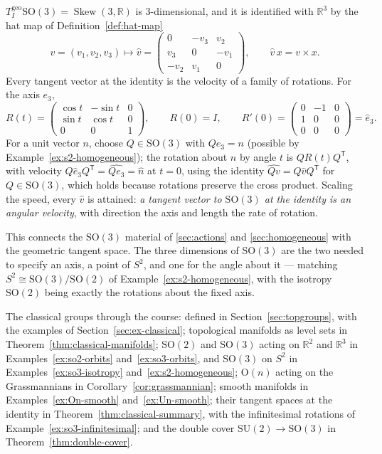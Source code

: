 \documentclass[11pt]{report}
\makeatletter
\newcounter{excounter}[section]
\newcommand{\exlabel}[1]{\edef\@currentlabel{\arabic{section}.\arabic{excounter}}\label{#1}}
\newcommand{\Ogp}{\mathrm{O}}
\newcommand{\SO}{\mathrm{SO}}
\DeclareMathOperator{\Skew}{Skew}
\newcommand{\geo}{\mathrm{geo}}
\makeatother
\begin{document}
\begin{exbox}[$\SO(3)$ and Infinitesimal Rotations]\exlabel{ex:so3-infinitesimal}
$T^{\geo}_I\SO(3) = \Skew(3,\mathbb{R})$ is $3$-dimensional, and it is identified with $\mathbb{R}^3$ by the hat map of Definition~\ref{def:hat-map}
\[
v = (v_1,v_2,v_3) \longmapsto \hat v = \begin{pmatrix} 0 & -v_3 & v_2 \\ v_3 & 0 & -v_1 \\ -v_2 & v_1 & 0 \end{pmatrix},
\qquad \hat v\, x = v \times x .
\]
Every tangent vector at the identity is the velocity of a family of rotations. For the axis $e_3$,
\[
R(t) = \begin{pmatrix} \cos t & -\sin t & 0 \\ \sin t & \cos t & 0 \\ 0 & 0 & 1 \end{pmatrix}, \qquad R(0) = I, \qquad R'(0) = \begin{pmatrix} 0 & -1 & 0 \\ 1 & 0 & 0 \\ 0 & 0 & 0 \end{pmatrix} = \hat e_3 .
\]
For a unit vector $n$, choose $Q \in \SO(3)$ with $Qe_3 = n$ (possible by Example~\ref{ex:s2-homogeneous}); the rotation about $n$ by angle $t$ is $QR(t)Q^{\mathsf T}$, with velocity $Q\hat e_3 Q^{\mathsf T} = \widehat{Qe_3} = \hat n$ at $t = 0$, using the identity $\widehat{Qv} = Q\hat vQ^{\mathsf T}$ for $Q \in \SO(3)$, which holds because rotations preserve the cross product. Scaling the speed, every $\hat v$ is attained: \emph{a tangent vector to $\SO(3)$ at the identity is an angular velocity}, with direction the axis and length the rate of rotation.
\end{exbox}

\begin{rembox}\label{rem:tangent-6}
This connects the $\SO(3)$ material of \ref{sec:actions} and \ref{sec:homogeneous} with the geometric tangent space. The three dimensions of $\SO(3)$ are the two needed to specify an axis, a point of $S^2$, and one for the angle about it --- matching $S^2 \cong \SO(3)/\SO(2)$ of Example~\ref{ex:s2-homogeneous}, with the isotropy $\SO(2)$ being exactly the rotations about the fixed axis.
\end{rembox}

The classical groups through the course: defined in Section~\ref{sec:topgroups}, with the examples of Section~\ref{sec:ex-classical}; topological manifolds as level sets in Theorem~\ref{thm:classical-manifolds}; $\SO(2)$ and $\SO(3)$ acting on $\mathbb{R}^2$ and $\mathbb{R}^3$ in Examples~\ref{ex:so2-orbits} and~\ref{ex:so3-orbits}, and $\SO(3)$ on $S^2$ in Examples~\ref{ex:so3-isotropy} and~\ref{ex:s2-homogeneous}; $\Ogp(n)$ acting on the Grassmannians in Corollary~\ref{cor:grassmannian}; smooth manifolds in Examples~\ref{ex:On-smooth} and~\ref{ex:Un-smooth}; their tangent spaces at the identity in Theorem~\ref{thm:classical-summary}, with the infinitesimal rotations of Example~\ref{ex:so3-infinitesimal}; and the double cover $\mathrm{SU}(2) \to \SO(3)$ in Theorem~\ref{thm:double-cover}.
\end{document}
